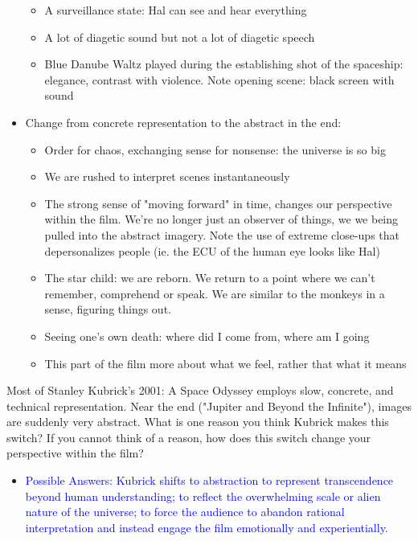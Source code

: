 \documentclass[11pt,fleqn]{book}
\begin{document}
\begin{itemize}
\begin{itemize}
        \item A surveillance state: Hal can see and hear everything
        \item A lot of diagetic sound but not a lot of diagetic speech
        \item Blue Danube Waltz played during the establishing shot of the spaceship: elegance, contrast with violence. Note opening scene: black screen with sound
    \end{itemize}
    \item Change from concrete representation to the abstract in the end:
    \begin{itemize}
        \item Order for chaos, exchanging sense for nonsense: the universe is so big
        \item We are rushed to interpret scenes instantaneously
        \item The strong sense of "moving forward" in time, changes our perspective within the film. We're no longer just an observer of things, we we being pulled into the abstract imagery. Note the use of extreme close-ups that depersonalizes people (ie. the ECU of the human eye looks like Hal)
        \item The star child: we are reborn. We return to a point where we can't remember, comprehend or speak. We are similar to the monkeys in a sense, figuring things out. 
        \item Seeing one's own death: where did I come from, where am I going
        \item This part of the film more about what we feel, rather that what it means
    \end{itemize}
\end{itemize}
\begin{exercise}
Most of Stanley Kubrick's 2001: A Space Odyssey employs slow, concrete, and technical representation. Near the end ("Jupiter and Beyond the Infinite"), images are suddenly very abstract. What is one reason you think Kubrick makes this switch? If you cannot think of a reason, how does this switch change your perspective within the film?
\begin{itemize}
\item \textcolor{blue}{Possible Answers:  Kubrick shifts to abstraction to represent transcendence beyond human understanding; to reflect  the overwhelming scale or alien nature of the universe; to force the audience to abandon rational interpretation and instead engage the film emotionally and experientially.}
\end{itemize}
\end{exercise}
\end{document}
